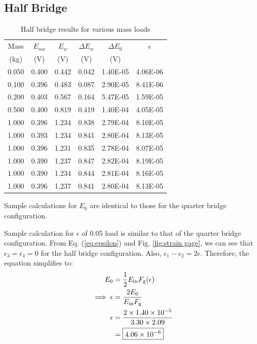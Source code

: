 \subsection{Half Bridge}
\begin{table}
    \centering
    \caption{Half bridge results for various mass loads}
    \label{tab:Q1HalfBridge}
    \begin{tabular}{cccccc}
        \toprule
        Mass & $E_{nw}$ & $E_w$ & $\Delta E_w$ & $\Delta E_0$ & $\epsilon$ \\
        (kg) & (V) & (V) & (V) & (V) & \\
        \midrule
        0.050 & 0.400 & 0.442 & 0.042 & 1.40E-05 & 4.06E-06 \\
        0.100 & 0.396 & 0.483 & 0.087 & 2.90E-05 & 8.41E-06 \\
        0.200 & 0.403 & 0.567 & 0.164 & 5.47E-05 & 1.59E-05 \\
        0.500 & 0.400 & 0.819 & 0.419 & 1.40E-04 & 4.05E-05 \\
        1.000 & 0.396 & 1.234 & 0.838 & 2.79E-04 & 8.10E-05 \\
        1.000 & 0.393 & 1.234 & 0.841 & 2.80E-04 & 8.13E-05 \\
        1.000 & 0.396 & 1.231 & 0.835 & 2.78E-04 & 8.07E-05 \\
        1.000 & 0.390 & 1.237 & 0.847 & 2.82E-04 & 8.19E-05 \\
        1.000 & 0.390 & 1.234 & 0.844 & 2.81E-04 & 8.16E-05 \\
        1.000 & 0.396 & 1.237 & 0.841 & 2.80E-04 & 8.13E-05 \\
        \bottomrule
    \end{tabular}
\end{table}

Sample calculations for $E_0$ are identical to those for the quarter bridge configuration. 

Sample calculation for $\epsilon$ of 0.05 load is similar to that of the quarter bridge configuration. From Eq. (\ref{eq:epsilon}) and 
Fig. \ref{fig:strain gage}, we can see that $\epsilon_3 = \epsilon_4 = 0$ for the half bridge configuration. Also,
$\epsilon_1 - \epsilon_2 = 2 \epsilon$. Therefore, the equation simplifies to:
\begin{align*}
    E_0 &= \frac{1}{2} E_{\text{in}} F_{\text{g}}
    (\epsilon) \\
    \implies \epsilon &= \frac{2 E_0}{E_{\text{in}} F_{\text{g}}} \\
    \epsilon &= \frac{2 \times 1.40\times 10^{-5}}{3.30 \times 2.09} \\
     &= \boxed{\qty{4.06E-06}{}}
\end{align*}

